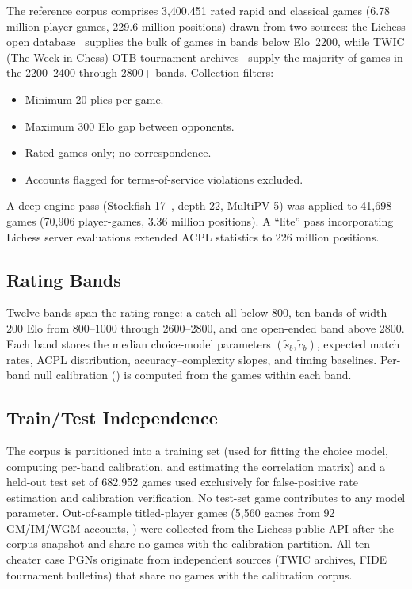 \documentclass[11pt,a4paper]{article}
\theoremstyle{definition}
\begin{document}
The reference corpus comprises 3{,}400{,}451 rated rapid and classical
games (6.78 million player-games, 229.6 million positions) drawn from
two sources: the Lichess open database~\citep{lichess2024database} supplies the
bulk of games in bands below Elo~2200, while TWIC (The Week in Chess)
OTB tournament archives~\citep{twic2024} supply the majority of games
in the 2200--2400 through 2800+ bands.  Collection filters:
\begin{itemize}[nosep]
  \item Minimum 20 plies per game.
  \item Maximum 300 Elo gap between opponents.
  \item Rated games only; no correspondence.
  \item Accounts flagged for terms-of-service violations excluded.
\end{itemize}

A deep engine pass (Stockfish 17~\citep{stockfish2024}, depth 22, MultiPV 5) was applied to
41{,}698 games (70{,}906 player-games, 3.36 million positions).  A
``lite'' pass incorporating Lichess server evaluations extended ACPL
statistics to 226 million positions.

\subsection{Rating Bands}

Twelve bands span the rating range: a catch-all below 800, ten bands
of width 200 Elo from 800--1000 through 2600--2800, and one open-ended
band above 2800.  Each band
stores the median choice-model parameters $(\tilde{s}_b, \tilde{c}_b)$,
expected match rates, ACPL distribution, accuracy--complexity slopes,
and timing baselines.  Per-band null calibration ()
is computed from the games within each band.

\subsection{Train/Test Independence}
\label{sec:traintestsplit}

The corpus is partitioned into a training set (used for fitting the
choice model, computing per-band calibration, and estimating the
correlation matrix) and a held-out test set of 682{,}952 games used
exclusively for false-positive rate estimation and calibration
verification.  No test-set game contributes to any model parameter.
Out-of-sample titled-player games (5{,}560 games from 92 GM/IM/WGM
accounts, ) were collected from the Lichess public API
after the corpus snapshot and share no games with the calibration
partition.  All ten cheater case PGNs originate from independent
sources (TWIC archives, FIDE tournament bulletins) that share no games
with the calibration corpus.
\end{document}
